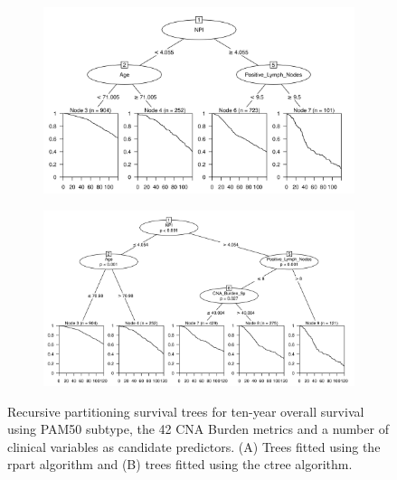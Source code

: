 \begin{figure}[!htb]
\centering

\vspace{1cm}

\begin{subfigure}{\textwidth}
\subcaption{}
\includegraphics[width=1\textwidth]{../figures/Appendices/Appendix_B/Clin_PA_PartyKit_Survival_Burden_TenYearOS_PAM50.png}
\end{subfigure}

\vspace{2cm}

\begin{subfigure}{\textwidth}
\subcaption{}
\includegraphics[width=1\textwidth]{../figures/Appendices/Appendix_B/Clin_PA_Ctree_Survival_Burden_TenYearOS_PAM50.png}
\end{subfigure}

\vspace{1cm}

\caption[Recursive partitioning survival trees for ten-year overall survival using PAM50 subtype, the 42 CNA Burden metrics and a number of clinical variables as candidate predictors.]{Recursive partitioning survival trees for ten-year overall survival using PAM50 subtype, the 42 CNA Burden metrics and a number of clinical variables as candidate predictors. (A) Trees fitted using the rpart algorithm and (B) trees fitted using the ctree algorithm.}
\end{figure}

